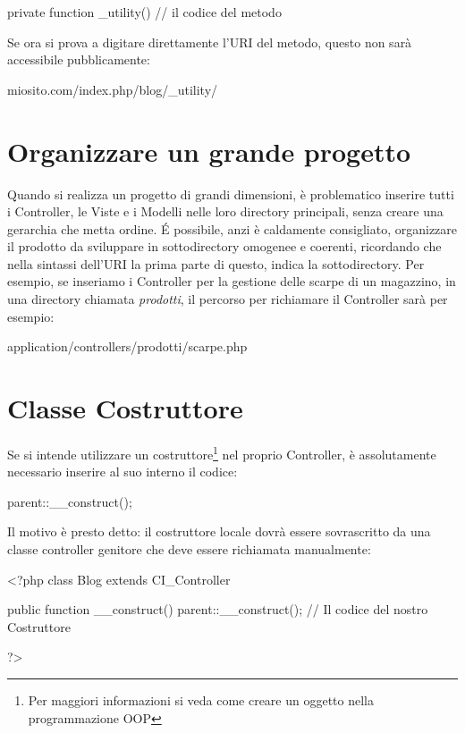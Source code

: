 \begin{code}
private function _utility()
{
  // il codice del metodo
}
\end{code}

Se ora si prova a digitare direttamente l'\ac{URI} del metodo, questo non sarà accessibile pubblicamente:

\begin{code}
miosito.com/index.php/blog/_utility/
\end{code}

\section{Organizzare un grande progetto}
Quando si realizza un progetto di grandi dimensioni, è problematico inserire tutti i Controller, le Viste e i Modelli nelle loro directory principali, senza creare una gerarchia che metta ordine.
\'E possibile, anzi è caldamente consigliato, organizzare il prodotto da sviluppare in sottodirectory omogenee e coerenti, ricordando che nella sintassi dell'\ac{URI} la prima parte di questo, indica la sottodirectory. Per esempio, se inseriamo i Controller per la gestione delle scarpe di un magazzino, in una directory chiamata \emph{prodotti}, il percorso per richiamare il Controller  sarà per esempio:

\begin{code}
application/controllers/prodotti/scarpe.php
\end{code}

\section{Classe Costruttore}
Se si intende utilizzare un costruttore\footnote{Per maggiori informazioni si veda come creare un oggetto nella programmazione OOP} nel proprio Controller, è assolutamente necessario inserire al suo interno il codice:

\begin{code}
parent::__construct();
\end{code}

Il motivo è presto detto: il costruttore locale dovrà essere sovrascritto da una classe controller genitore che deve essere richiamata manualmente:

\begin{code}
<?php
class Blog extends CI_Controller {

       public function __construct()
       {
            parent::__construct();
            // Il codice del nostro Costruttore
       }
}
?>
\end{code}

